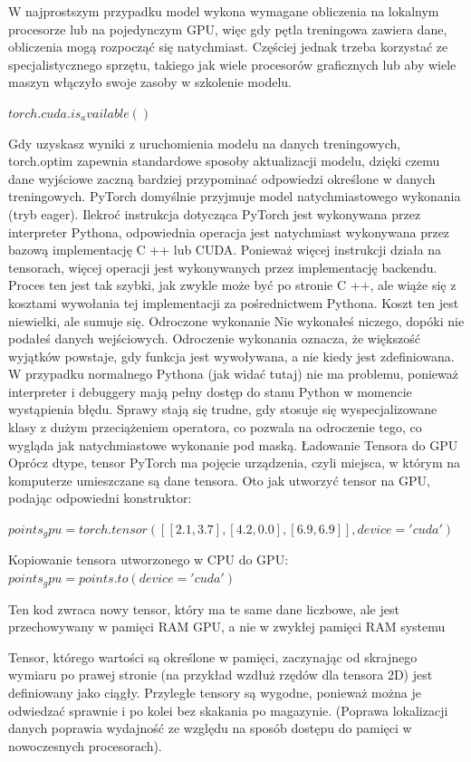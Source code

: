 \documentclass[brudnopis]{xmgr}
\begin{document}
W najprostszym przypadku model wykona wymagane obliczenia na lokalnym procesorze lub na pojedynczym GPU, więc gdy pętla treningowa zawiera dane, obliczenia mogą rozpocząć się natychmiast. Częściej jednak trzeba korzystać ze specjalistycznego sprzętu, takiego jak wiele procesorów graficznych lub aby wiele maszyn włączyło swoje zasoby w szkolenie modelu. 

$torch.cuda.is_available()$

Gdy uzyskasz wyniki z uruchomienia modelu na danych treningowych, torch.optim zapewnia standardowe sposoby aktualizacji modelu, dzięki czemu dane wyjściowe zaczną bardziej przypominać odpowiedzi określone w danych treningowych.
PyTorch domyślnie przyjmuje model natychmiastowego wykonania (tryb eager).
 Ilekroć instrukcja dotycząca PyTorch jest wykonywana przez interpreter Pythona, odpowiednia operacja jest natychmiast wykonywana przez bazową implementację C ++ lub CUDA. Ponieważ więcej instrukcji działa na tensorach, więcej operacji jest wykonywanych przez implementację backendu. Proces ten jest tak szybki, jak zwykle może być po stronie C ++, ale wiąże się z kosztami wywołania tej implementacji za pośrednictwem Pythona. Koszt ten jest niewielki, ale sumuje się.
Odroczone wykonanie
Nie wykonałeś niczego, dopóki nie podałeś danych wejściowych. Odroczenie wykonania oznacza, że większość wyjątków powstaje, gdy funkcja jest wywoływana, a nie kiedy jest zdefiniowana. W przypadku normalnego Pythona (jak widać tutaj) nie ma problemu, ponieważ interpreter i debuggery mają pełny dostęp do stanu Python w momencie wystąpienia błędu.
Sprawy stają się trudne, gdy stosuje się wyspecjalizowane klasy z dużym przeciążeniem operatora, co pozwala na odroczenie tego, co wygląda jak natychmiastowe wykonanie pod maską.  Ładowanie Tensora do GPU
Oprócz dtype, tensor PyTorch ma pojęcie urządzenia, czyli miejsca, w którym na komputerze umieszczane są dane tensora. 
Oto jak utworzyć tensor na GPU, podając odpowiedni konstruktor:

$points_gpu = torch.tensor([[2.1, 3.7], [4.2, 0.0], [6.9, 6.9]], device='cuda')$

Kopiowanie tensora utworzonego w CPU do GPU:
$points_gpu = points.to(device='cuda')$

Ten kod zwraca nowy tensor, który ma te same dane liczbowe, ale jest przechowywany w pamięci RAM GPU, a nie w zwykłej pamięci RAM systemu

Tensor, którego wartości są określone w pamięci, zaczynając od skrajnego wymiaru po prawej stronie (na przykład wzdłuż rzędów dla tensora 2D) jest definiowany jako ciągły. Przyległe tensory są wygodne, ponieważ można je odwiedzać sprawnie i po kolei bez skakania po magazynie. (Poprawa lokalizacji danych poprawia wydajność ze względu na sposób dostępu do pamięci w nowoczesnych procesorach).
\end{document}
